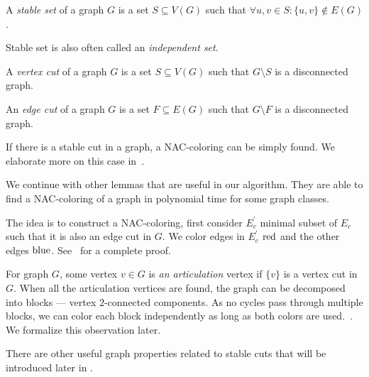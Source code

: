 %
\begin{definition}
	A \emph{stable set} of a graph \( G \) is a set \( S \subseteq V(G) \) such that
	\( \forall u, v \in S : \{u, v\} \not\in E(G) \).
\end{definition}
%
Stable set is also often called an \emph{independent set}.
%
\begin{definition}
	A \emph{vertex cut} of a graph \( G \) is a set \( S \subseteq V(G) \) such that
	\( G \setminus S \) is a disconnected graph.
\end{definition}
%
\begin{definition}
	An \emph{edge cut} of a graph \( G \) is a set \( F \subseteq E(G) \) such that
	\( G \setminus F \) is a disconnected graph.
\end{definition}
%
%
If there is a stable cut in a graph, a NAC-coloring can be simply found.
We elaborate more on this case in~.

We continue with other lemmas that are useful in our algorithm.
They are able to find a NAC-coloring of a graph in polynomial time for some graph classes.
%
%
The idea is to construct a NAC-coloring, first consider \( E_c^\prime \) minimal subset of \( E_c \)
such that it is also an edge cut in \( G \).
We color edges in \( E_c^\prime \) \( \text{red} \) and the other edges \( \text{blue} \).
See~\cite{legersky_original} for a complete proof.

For graph \( G \), some vertex \( v \in G \) is \emph{an articulation} vertex if
\( \{v\} \) is a vertex cut in \( G \).
When all the articulation vertices are found,
the graph can be decomposed into blocks
--- vertex \( 2 \)-connected components.
As no cycles pass through multiple blocks, we can color each block
independently as long as both colors are used.~\cite{my_paper}.
We formalize this observation later.

There are other useful graph properties related to stable cuts
that will be introduced later in .

